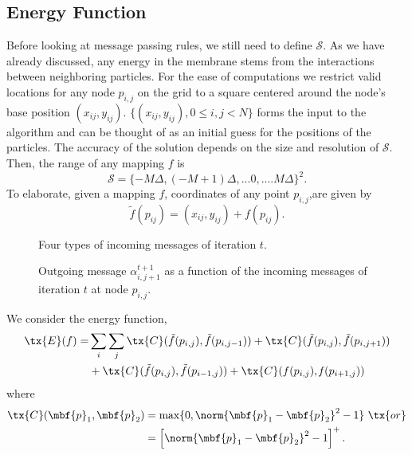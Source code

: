 \documentclass[journal, onecolumn]{IEEEtran}
\begin{document}
\subsection{Energy Function}
Before looking at message passing rules, we still need to define $\mathcal{S}$. As we have already discussed, any energy in the membrane stems from the interactions between neighboring particles. For the ease of computations we restrict valid locations for any node $p_{i,j}$ on the grid to a square centered around the node's base position $(x_{ij},y_{ij})$.  $\{(x_{ij},y_{ij}),0\leq i,j<N\}$ forms the  input to the algorithm and can be thought of as an initial guess for the positions of the particles. The accuracy of the solution depends on the size and resolution of $\mathcal{S}$. Then, the range of any mapping $f$ is
\begin{equation}
\mathcal{S}=\{-M\Delta,(-M+1)\Delta,...0,....M\Delta\}^{2}.
\end{equation}
To elaborate, given a mapping $\mathit{f}$, coordinates of any point $p_{i,j}$,are given by
 \begin{equation*}
\tilde{f}(p_{ij})=(x_{ij},y_{ij})+\mathit{f}\left(p_{ij}\right).
 \end{equation*}
\begin{figure}[t]
\centering
\scalebox{.85}{}
\caption{Four types of  incoming messages of iteration $t$.}
\label{Fig:MessageTypes}
\end{figure}


\begin{figure}[b]
\centering
\scalebox{.85}{}
\caption{Outgoing message $\alpha_{i,j+1}^{t+1}$ as a function of the incoming messages  of iteration $t$ at node $p_{i,j}$.}
\label{Fig:OutgoingMessage}
\end{figure}

We consider the energy function,
\begin{align}
 \tx{E}(f)= &\sum_{i} \sum_{j} \tx{C}(\tilde{f}(p_{i,j}),\tilde{f}(p_{i,j-1})) + \tx{C}(\tilde{f}(p_{i,j}),\tilde{f}(p_{i,j+1})) \\ \notag
					  & +\tx{C}(\tilde{f}(p_{i,j}),\tilde{f}(p_{i-1,j})) + \tx{C}(f(p_{i,j}),\mathit{f}(p_{i+1,j}))
\end{align}
where
\begin{align}
  \tx{C}(\mbf{p}_{1},\mbf{p}_{2})&=\max \{0,\norm{\mbf{p}_{1} - \mbf{p}_{2}}^{2}-1 \} ~ \tx{ or } \notag\\
               &=\left[\norm{\mbf{p}_{1} - \mbf{p}_{2}}^{2}-1 \right]^{+}.
\label{Eqn:CostFunction1}
\end{align}
\end{document}
